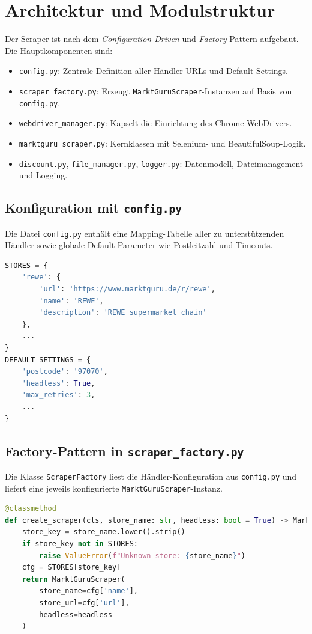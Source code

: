 \documentclass[12pt, a4paper]{report} %
\begin{document}
\section{Architektur und Modulstruktur}
Der Scraper ist nach dem \emph{Configuration-Driven} und \emph{Factory}-Pattern aufgebaut. Die Hauptkomponenten sind:
\begin{itemize}
  \item \texttt{config.py}: Zentrale Definition aller Händler-URLs und Default-Settings.  
  \item \texttt{scraper\_factory.py}: Erzeugt \texttt{MarktGuruScraper}-Instanzen auf Basis von \texttt{config.py}.  
  \item \texttt{webdriver\_manager.py}: Kapselt die Einrichtung des Chrome WebDrivers.  
  \item \texttt{marktguru\_scraper.py}: Kernklassen mit Selenium- und BeautifulSoup-Logik.  
  \item \texttt{discount.py}, \texttt{file\_manager.py}, \texttt{logger.py}: Datenmodell, Dateimanagement und Logging.  
\end{itemize}

\subsection{Konfiguration mit \texttt{config.py}}
Die Datei \texttt{config.py} enthält eine Mapping-Tabelle aller zu unterstützenden Händler sowie globale Default-Parameter wie Postleitzahl und Timeouts.
\begin{lstlisting}[language=Python, caption={Auszug aus \texttt{config.py}}]
STORES = {
    'rewe': {
        'url': 'https://www.marktguru.de/r/rewe',
        'name': 'REWE',
        'description': 'REWE supermarket chain'
    },
    ...
}
DEFAULT_SETTINGS = {
    'postcode': '97070',
    'headless': True,
    'max_retries': 3,
    ...
}
\end{lstlisting}

\subsection{Factory-Pattern in \texttt{scraper\_factory.py}}
Die Klasse \texttt{ScraperFactory} liest die Händler-Konfiguration aus \texttt{config.py} und liefert eine jeweils konfigurierte \texttt{MarktGuruScraper}-Instanz.

\begin{lstlisting}[language=Python, caption={Schlüsselmethode in \texttt{scraper\_factory.py}}]
@classmethod
def create_scraper(cls, store_name: str, headless: bool = True) -> MarktGuruScraper:
    store_key = store_name.lower().strip()
    if store_key not in STORES:
        raise ValueError(f"Unknown store: {store_name}")
    cfg = STORES[store_key]
    return MarktGuruScraper(
        store_name=cfg['name'],
        store_url=cfg['url'],
        headless=headless
    )
\end{lstlisting}
\end{document}
